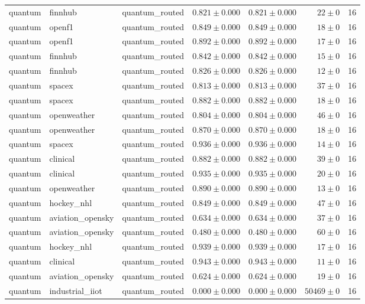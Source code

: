 \begin{table}[htbp]
\begin{tabular}{l l l r r r r}
quantum & finnhub & quantum\_routed & $0.821\pm0.000$ & $0.821\pm0.000$ & $22\pm0$ & 16 \\
quantum & openf1 & quantum\_routed & $0.849\pm0.000$ & $0.849\pm0.000$ & $18\pm0$ & 16 \\
quantum & openf1 & quantum\_routed & $0.892\pm0.000$ & $0.892\pm0.000$ & $17\pm0$ & 16 \\
quantum & finnhub & quantum\_routed & $0.842\pm0.000$ & $0.842\pm0.000$ & $15\pm0$ & 16 \\
quantum & finnhub & quantum\_routed & $0.826\pm0.000$ & $0.826\pm0.000$ & $12\pm0$ & 16 \\
quantum & spacex & quantum\_routed & $0.813\pm0.000$ & $0.813\pm0.000$ & $37\pm0$ & 16 \\
quantum & spacex & quantum\_routed & $0.882\pm0.000$ & $0.882\pm0.000$ & $18\pm0$ & 16 \\
quantum & openweather & quantum\_routed & $0.804\pm0.000$ & $0.804\pm0.000$ & $46\pm0$ & 16 \\
quantum & openweather & quantum\_routed & $0.870\pm0.000$ & $0.870\pm0.000$ & $18\pm0$ & 16 \\
quantum & spacex & quantum\_routed & $0.936\pm0.000$ & $0.936\pm0.000$ & $14\pm0$ & 16 \\
quantum & clinical & quantum\_routed & $0.882\pm0.000$ & $0.882\pm0.000$ & $39\pm0$ & 16 \\
quantum & clinical & quantum\_routed & $0.935\pm0.000$ & $0.935\pm0.000$ & $20\pm0$ & 16 \\
quantum & openweather & quantum\_routed & $0.890\pm0.000$ & $0.890\pm0.000$ & $13\pm0$ & 16 \\
quantum & hockey\_nhl & quantum\_routed & $0.849\pm0.000$ & $0.849\pm0.000$ & $47\pm0$ & 16 \\
quantum & aviation\_opensky & quantum\_routed & $0.634\pm0.000$ & $0.634\pm0.000$ & $37\pm0$ & 16 \\
quantum & aviation\_opensky & quantum\_routed & $0.480\pm0.000$ & $0.480\pm0.000$ & $60\pm0$ & 16 \\
quantum & hockey\_nhl & quantum\_routed & $0.939\pm0.000$ & $0.939\pm0.000$ & $17\pm0$ & 16 \\
quantum & clinical & quantum\_routed & $0.943\pm0.000$ & $0.943\pm0.000$ & $11\pm0$ & 16 \\
quantum & aviation\_opensky & quantum\_routed & $0.624\pm0.000$ & $0.624\pm0.000$ & $19\pm0$ & 16 \\
quantum & industrial\_iiot & quantum\_routed & $0.000\pm0.000$ & $0.000\pm0.000$ & $50469\pm0$ & 16 \\

\end{tabular}
\end{table}
